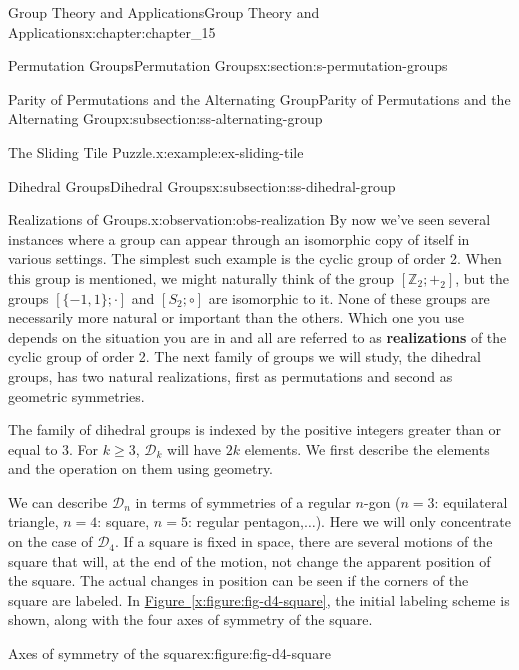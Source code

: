 \documentclass[oneside,10pt,]{book}
\newcommand{\xreffont}{\relax}
\newcommand{\terminology}[1]{\textbf{#1}}
\numberwithin{equation}{section}
\begin{document}
\begin{chapterptx}{Group Theory and Applications}{}{Group Theory and Applications}{}{}{x:chapter:chapter_15}
\begin{sectionptx}{Permutation Groups}{}{Permutation Groups}{}{}{x:section:s-permutation-groups}
\begin{subsectionptx}{Parity of Permutations and the Alternating Group}{}{Parity of Permutations and the Alternating Group}{}{}{x:subsection:ss-alternating-group}
\begin{example}{The Sliding Tile Puzzle.}{x:example:ex-sliding-tile}
\end{example}
\end{subsectionptx}
%
%
\typeout{************************************************}
\typeout{************************************************}
%
\begin{subsectionptx}{Dihedral Groups}{}{Dihedral Groups}{}{}{x:subsection:ss-dihedral-group}
%
\begin{observation}{Realizations of Groups.}{x:observation:obs-realization}%
By now we've seen several instances where a group can appear through an isomorphic copy of itself in various settings.  The simplest such example is the cyclic group of order 2.   When this group is mentioned, we might naturally think of the group \(\left[\mathbb{Z}_2;+_2\right]\), but the groups \([\{-1,1\};\cdot ]\)  and \(\left[S_2;\circ \right]\) are isomorphic to it.  None of these groups are necessarily more natural or important than the others.  Which one you use depends on the situation you are in and all are referred to as \terminology{realizations}  of the cyclic group of order 2.   The next family of groups we will study, the dihedral groups, has two natural realizations, first as permutations and second as geometric symmetries.%
\end{observation}
The family of dihedral groups is indexed by the positive integers greater than or equal to 3.  For \(k \geq 3\), \(\mathcal{D}_k\) will have \(2k\) elements.  We first describe the elements and the operation on them using geometry.%
\par
We can describe \(\mathcal{D}_n\) in terms of symmetries of a regular \(n\)-gon (\(n = 3\): equilateral triangle, \(n = 4\): square, \(n = 5\):  regular pentagon,\(\ldots \)).  Here we will only concentrate on the case of \(\mathcal{D}_4\). If a square is fixed in space, there are several motions of the square that will, at the end of the motion, not change the apparent position of the square. The actual changes in position can be seen if the corners of the square are labeled. In \hyperref[x:figure:fig-d4-square]{Figure~{\xreffont\ref{x:figure:fig-d4-square}}}, the initial labeling scheme is shown, along with the four axes of symmetry of the square.%
\begin{figureptx}{Axes of symmetry of the square}{x:figure:fig-d4-square}{}%
\begin{image}{0.15}{0.7}{0.15}%

\end{image}
\end{figureptx}
\end{subsectionptx}
\end{sectionptx}
\end{chapterptx}
\end{document}
